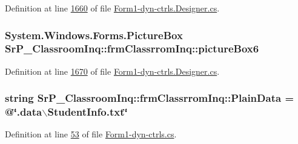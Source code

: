\-Definition at line \hyperlink{_form1-dyn-ctrls_8_designer_8cs_source_l01660}{1660} of file \hyperlink{_form1-dyn-ctrls_8_designer_8cs_source}{\-Form1-\/dyn-\/ctrls.\-Designer.\-cs}.

\hypertarget{class_sr_p___classroom_inq_1_1frm_classrrom_inq_a1431b950ca4cfb27ea99f44116fa80da}{
\subsubsection[{picture\-Box6}]{\setlength{\rightskip}{0pt plus 5cm}\-System.\-Windows.\-Forms.\-Picture\-Box {\bf \-Sr\-P\-\_\-\-Classroom\-Inq\-::frm\-Classrrom\-Inq\-::picture\-Box6}}}
\label{class_sr_p___classroom_inq_1_1frm_classrrom_inq_a1431b950ca4cfb27ea99f44116fa80da}


\-Definition at line \hyperlink{_form1-dyn-ctrls_8_designer_8cs_source_l01670}{1670} of file \hyperlink{_form1-dyn-ctrls_8_designer_8cs_source}{\-Form1-\/dyn-\/ctrls.\-Designer.\-cs}.

\hypertarget{class_sr_p___classroom_inq_1_1frm_classrrom_inq_a511d08cf3bdc5282be448f0513bbd262}{
\subsubsection[{\-Plain\-Data}]{\setlength{\rightskip}{0pt plus 5cm}string {\bf \-Sr\-P\-\_\-\-Classroom\-Inq\-::frm\-Classrrom\-Inq\-::\-Plain\-Data} = @\char`\"{}.data$\backslash$\-Student\-Info.\-txt\char`\"{}}}
\label{class_sr_p___classroom_inq_1_1frm_classrrom_inq_a511d08cf3bdc5282be448f0513bbd262}


\-Definition at line \hyperlink{_form1-dyn-ctrls_8cs_source_l00053}{53} of file \hyperlink{_form1-dyn-ctrls_8cs_source}{\-Form1-\/dyn-\/ctrls.\-cs}.

